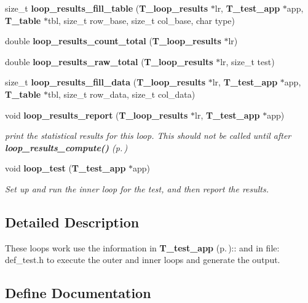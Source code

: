 \begin{CompactItemize}
\item 
size\_\-t {\bf loop\_\-results\_\-fill\_\-table} ({\bf T\_\-loop\_\-results} $\ast$lr, {\bf T\_\-test\_\-app} $\ast$app, {\bf T\_\-table} $\ast$tbl, size\_\-t row\_\-base, size\_\-t col\_\-base, char type)
\item 
double {\bf loop\_\-results\_\-count\_\-total} ({\bf T\_\-loop\_\-results} $\ast$lr)
\item 
double {\bf loop\_\-results\_\-raw\_\-total} ({\bf T\_\-loop\_\-results} $\ast$lr, size\_\-t test)
\item 
size\_\-t {\bf loop\_\-results\_\-fill\_\-data} ({\bf T\_\-loop\_\-results} $\ast$lr, {\bf T\_\-test\_\-app} $\ast$app, {\bf T\_\-table} $\ast$tbl, size\_\-t row\_\-data, size\_\-t col\_\-data)
\item 
void {\bf loop\_\-results\_\-report} ({\bf T\_\-loop\_\-results} $\ast$lr, {\bf T\_\-test\_\-app} $\ast$app)
\begin{CompactList}\small\item\em print the statistical results for this loop. This should not be called until after {\bf loop\_\-results\_\-compute()} {\rm (p.\,\pageref{group__loop__test_a7})}\item\end{CompactList}\item 
void {\bf loop\_\-test} ({\bf T\_\-test\_\-app} $\ast$app)
\begin{CompactList}\small\item\em Set up and run the inner loop for the test, and then report the results.\item\end{CompactList}\end{CompactItemize}


\subsection{Detailed Description}
These loops work use the information in {\bf T\_\-test\_\-app} {\rm (p.\,\pageref{structT__test__app})}:: and in file: def\_\-test.h to execute the outer and inner loops and generate the output.



\subsection{Define Documentation}
